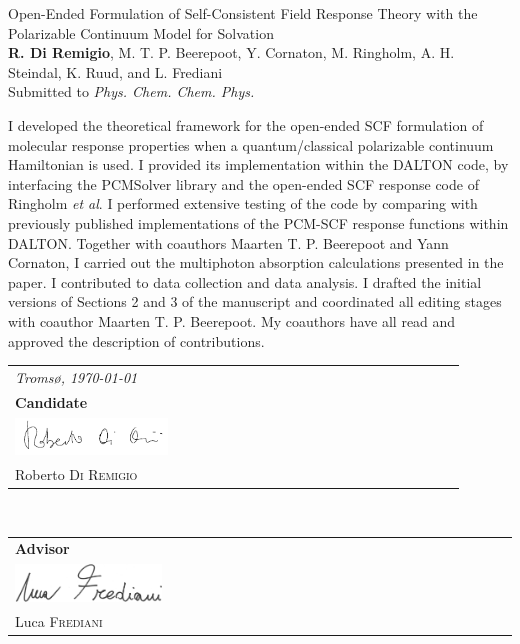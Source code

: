 \documentclass[notitlepage,a4paper,11pt,dvipsnames]{article}
\begin{document}
\begin{tcolorbox}
  {\small
  \textsf{Open-Ended Formulation of Self-Consistent Field Response Theory with
  the Polarizable Continuum Model for Solvation
  }
  \\
  \textbf{R. Di Remigio}, M. T. P. Beerepoot, Y. Cornaton, M. Ringholm,
  A. H. Steindal, K. Ruud, and L. Frediani
  \\
  Submitted to \textit{Phys. Chem. Chem. Phys.}
  }
\end{tcolorbox}
I developed the theoretical framework for the open-ended SCF formulation
of molecular response properties when a quantum/classical polarizable continuum
Hamiltonian is used.
I provided its implementation within the DALTON code, by interfacing the
PCMSolver library and the open-ended SCF response code of Ringholm \emph{et al}.
I performed extensive testing of the code by comparing with previously
published implementations of the PCM-SCF response functions within
DALTON.
Together with coauthors Maarten T. P. Beerepoot and Yann Cornaton, I carried out
the multiphoton absorption calculations presented in the paper. I contributed
to data collection and data analysis.
I drafted the initial versions of Sections 2 and 3 of the manuscript and coordinated all
editing stages with coauthor Maarten T. P. Beerepoot.
My coauthors have all read and approved the description of contributions.

\begin{flushright}
    \begin{tabular}{m{5cm}}
      \textit{Troms{\o}, \today} \\
        {\small \textbf{Candidate}} \\
      \includegraphics[width=0.35\textwidth]{gfx/signature.png} \\
        \hline
        {\small Roberto \textsc{Di Remigio}} \\
    \end{tabular}
    \\
    \begin{tabular}{m{5cm}}
        {\small \textbf{Advisor} }
        \\
      \includegraphics[width=0.3\textwidth]{gfx/LucaSignature.png} \\
        \hline
        {\small Luca \textsc{Frediani}} \\
    \end{tabular}
\end{flushright}
\end{document}
